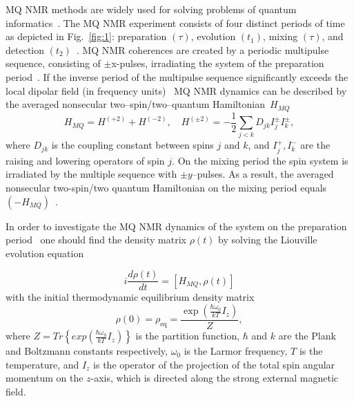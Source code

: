\documentclass[preprint,12pt]{elsarticle}
\begin{document}
MQ NMR methods are widely used for solving problems of quantum informatics~\cite{17,18}.
The MQ NMR experiment consists of four distinct periods of time as depicted in Fig.~\ref{fig:1}:
preparation $(\tau)$, evolution $(t_1)$, mixing $(\tau)$, and detection $(t_2)$~\cite{10}.
MQ NMR coherences are created by a periodic multipulse sequence, consisting of
$\pm$x-pulses, irradiating the system of the preparation period~\cite{10}.
If the inverse period of the multipulse sequence significantly exceeds the local dipolar field (in frequency units)~\cite{19}
MQ NMR dynamics can be described by the averaged nonsecular two--spin/two--quantum Hamiltonian~$H_{MQ}$~\cite{20}
%
\begin{equation} \label{eq:1}
        H_{MQ} = H^{(+2)} + H^{(-2)} , \quad
        H^{(\pm 2)} = -\frac{1}{2} \sum_{j<k} D_{jk} I_{j} ^\pm I_k^\pm,
\end{equation}
%
where $D_{jk}$ is the coupling constant between spins $j$ and $k$,
and $I_{j}^+, I_k ^-$ are the raising and lowering operators of spin $j$.
On the mixing period the spin system is irradiated by the multiple sequence with $\pm y$--pulses.
As a result, the averaged nonsecular two-spin/two quantum Hamiltonian on the mixing period equals $(-H_{MQ})$~\cite{10}.


In order to investigate the MQ NMR dynamics of the system on the preparation period~\cite{10} one should find the density matrix $\rho(t)$ by solving the Liouville evolution equation~\cite{19}

\begin{equation}
    \label{eq:2}
        i\frac{d\rho(t)}{dt} = [H_{MQ}, \rho(t)]
\end{equation}
with the initial thermodynamic equilibrium density matrix
\begin{equation}
    \label{eq:3}
        \rho(0) = \rho_\mathrm{eq} = \frac{\exp(\frac{\hbar \omega_0}{kT}I_z)}{Z},
\end{equation}
where $Z=Tr \left\{exp\left(\frac{\hbar \omega_0}{kT}I_z\right) \right\}$ is the partition function,
$\hbar$ and $k$ are the Plank and Boltzmann constants respectively,
$\omega_0$ is the Larmor frequency,
$T$ is the temperature,
and $I_z$ is the operator of the projection of the total spin angular momentum on the $z$-axis,
which is directed along the strong external magnetic field.
\end{document}
